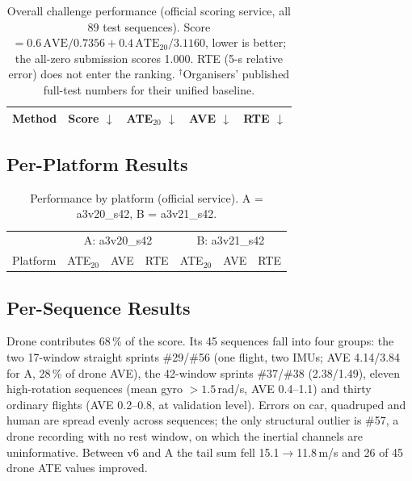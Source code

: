 \documentclass[letterpaper,10pt,conference]{ieeeconf}
\begin{document}
\begin{table}[htbp]
\centering\footnotesize
\caption{Overall challenge performance (official scoring service, all 89 test sequences).
Score $=0.6\,\mathrm{AVE}/0.7356+0.4\,\mathrm{ATE}_{20}/3.1160$, lower is better; the all-zero
submission scores 1.000. RTE (5-s relative error) does not enter the ranking.
$^{\dagger}$Organisers' published full-test numbers for their unified baseline.}
\setlength{\tabcolsep}{3.5pt}
\begin{tabular}{lcccc}
\toprule
Method & Score $\downarrow$ & ATE$_{20}$ $\downarrow$ & AVE $\downarrow$ & RTE $\downarrow$ \\
\midrule

\end{tabular}
\label{tab:overall_results}
\end{table}

\subsection{Per-Platform Results}
\begin{table}[htbp]
\centering\footnotesize
\caption{Performance by platform (official service). A = a3v20\_s42, B = a3v21\_s42.}
\setlength{\tabcolsep}{3pt}
\begin{tabular}{lccc|ccc}
\toprule
& \multicolumn{3}{c|}{A: a3v20\_s42} & \multicolumn{3}{c}{B: a3v21\_s42} \\
Platform & ATE$_{20}$ & AVE & RTE & ATE$_{20}$ & AVE & RTE \\
\midrule

\end{tabular}
\label{tab:platform_results}
\end{table}

\subsection{Per-Sequence Results}
Drone contributes 68\,\% of the score. Its 45 sequences fall into four groups: the two 17-window
straight sprints \#29/\#56 (one flight, two IMUs; AVE 4.14/3.84 for A, 28\,\% of drone AVE), the
42-window sprints \#37/\#38 (2.38/1.49), eleven high-rotation sequences (mean gyro $>1.5$\,rad/s,
AVE 0.4--1.1) and thirty ordinary flights (AVE 0.2--0.8, at validation level). Errors on car,
quadruped and human are spread evenly across sequences; the only structural outlier is \#57, a drone
recording with no rest window, on which the inertial channels are uninformative. Between v6 and A
the tail sum fell 15.1$\to$11.8\,m/s and 26 of 45 drone ATE values improved.
\end{document}
